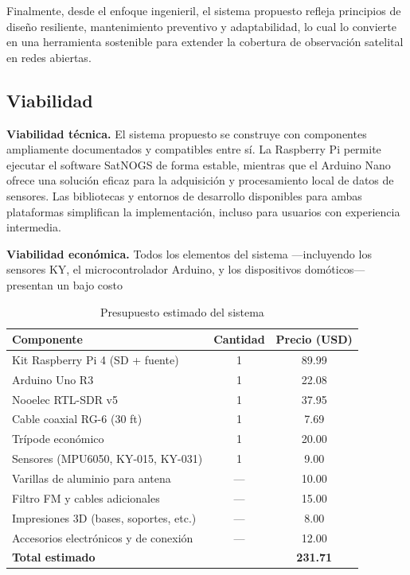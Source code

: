\documentclass[conference]{IEEEtran}
\begin{document}
Finalmente, desde el enfoque ingenieril, el sistema propuesto refleja principios de diseño resiliente, mantenimiento preventivo y adaptabilidad, lo cual lo convierte en una herramienta sostenible para extender la cobertura de observación satelital en redes abiertas.

\subsection{Viabilidad}

\textbf{Viabilidad técnica.} El sistema propuesto se construye con componentes ampliamente documentados y compatibles entre sí. La Raspberry Pi permite ejecutar el software SatNOGS de forma estable, mientras que el Arduino Nano ofrece una solución eficaz para la adquisición y procesamiento local de datos de sensores. Las bibliotecas y entornos de desarrollo disponibles para ambas plataformas simplifican la implementación, incluso para usuarios con experiencia intermedia.

\textbf{Viabilidad económica.} Todos los elementos del sistema —incluyendo los sensores KY, el microcontrolador Arduino, y los dispositivos domóticos— presentan un bajo costo

\begin{table}[H]
\centering
\caption{Presupuesto estimado del sistema}
\begin{tabular}{|l|c|c|}
\hline
\textbf{Componente} & \textbf{Cantidad} & \textbf{Precio (USD)} \\
\hline
Kit Raspberry Pi 4 (SD + fuente) & 1 & 89.99 \\
Arduino Uno R3                         & 1 & 22.08 \\
Nooelec RTL-SDR v5                     & 1 & 37.95 \\
Cable coaxial RG-6 (30 ft)             & 1 & 7.69  \\
Trípode económico                      & 1 & 20.00 \\
Sensores (MPU6050, KY-015, KY-031)     & 1 & 9.00  \\
Varillas de aluminio para antena       & — & 10.00 \\
Filtro FM y cables adicionales         & — & 15.00 \\
Impresiones 3D (bases, soportes, etc.) & — & 8.00  \\
Accesorios electrónicos y de conexión  & — & 12.00 \\
\hline
\textbf{Total estimado}                &    & \textbf{231.71} \\
\hline
\end{tabular}
\end{table}
\end{document}
